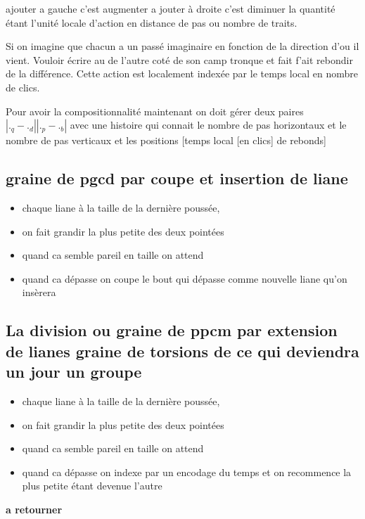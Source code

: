 \documentclass{article}
\begin{document}
ajouter a gauche c'est augmenter a jouter à droite c'est diminuer la quantité étant l'unité locale d'action en distance de pas ou nombre de traits.

Si on imagine que chacun a un passé imaginaire  en fonction de la direction d'ou il vient. Vouloir écrire au de l'autre coté de son camp  tronque et fait f'ait rebondir de la différence. Cette action est localement indexée par le temps local en nombre de clics. 

Pour avoir la compositionnalité maintenant on doit gérer  deux paires  $|._q -._d | | ._p  -  ._b|$ avec une histoire qui connait le nombre de pas horizontaux et le nombre de pas verticaux  et les positions [temps local [en clics] de rebonds]

\subsection{graine de  pgcd par coupe et insertion de liane }


\begin{itemize}
\item chaque liane à la taille de la dernière poussée, 
\item on fait grandir la plus petite des deux pointées 
\item quand   ca semble pareil en taille on attend
\item quand ca dépasse on coupe le bout qui dépasse comme nouvelle liane qu'on insèrera
\end{itemize}


\subsection{La division ou graine de ppcm par extension de lianes graine de torsions de ce qui deviendra un jour un groupe}

\begin{itemize}
\item chaque liane à la taille de la dernière poussée, 
\item on fait grandir la plus petite des deux pointées 
\item quand   ca semble pareil en taille on attend
\item quand ca dépasse on indexe par un encodage du temps et on recommence la plus petite étant devenue l'autre
\end{itemize}




\textbf{ a retourner}
\end{document}
